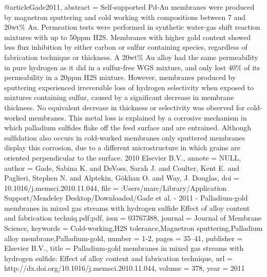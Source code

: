 @article{Gade2011,
abstract = {Self-supported Pd-Au membranes were produced by magnetron sputtering and cold working with compositions between 7 and 20wt{\%} Au. Permeation tests were performed in synthetic water-gas shift reaction mixtures with up to 50ppm H2S. Membranes with higher gold content showed less flux inhibition by either carbon or sulfur containing species, regardless of fabrication technique or thickness. A 20wt{\%} Au alloy had the same permeability in pure hydrogen as it did in a sulfur-free WGS mixture, and only lost 40{\%} of its permeability in a 20ppm H2S mixture. However, membranes produced by sputtering experienced irreversible loss of hydrogen selectivity when exposed to mixtures containing sulfur, caused by a significant decrease in membrane thickness. No equivalent decrease in thickness or selectivity was observed for cold-worked membranes. This metal loss is explained by a corrosive mechanism in which palladium sulfides flake off the feed surface and are entrained. Although sulfidation also occurs in cold-worked membranes only sputtered membranes display this corrosion, due to a different microstructure in which grains are oriented perpendicular to the surface. {\textcopyright} 2010 Elsevier B.V.},
annote = {NULL},
author = {Gade, Sabina K. and DeVoss, Sarah J. and Coulter, Kent E. and Paglieri, Stephen N. and Alptekin, G{\"{o}}khan O. and Way, J. Douglas},
doi = {10.1016/j.memsci.2010.11.044},
file = {:Users/marc/Library/Application Support/Mendeley Desktop/Downloaded/Gade et al. - 2011 - Palladium-gold membranes in mixed gas streams with hydrogen sulfide Effect of alloy content and fabrication techniq.pdf:pdf},
issn = {03767388},
journal = {Journal of Membrane Science},
keywords = {Cold-working,H2S tolerance,Magnetron sputtering,Palladium alloy membrane,Palladium-gold},
number = {1-2},
pages = {35--41},
publisher = {Elsevier B.V.},
title = {{Palladium-gold membranes in mixed gas streams with hydrogen sulfide: Effect of alloy content and fabrication technique}},
url = {http://dx.doi.org/10.1016/j.memsci.2010.11.044},
volume = {378},
year = {2011}
}
